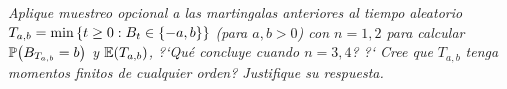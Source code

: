 \emph{
    Aplique muestreo opcional a las martingalas anteriores al tiempo 
    aleatorio $T_{a,b}=\min\left\{ t\geq 0:B_t\in\left\{ -a,b\right\} \right\} $ (para $a,b>0$) 
    con $n=1,2$ para calcular $\mathbb{P}\! \left( B_{T_{a,b}}=b \right)$ y $\mathbb{E}\! \left( T_{a,b} \right)$,
    ?`Qu\'e concluye cuando $n=3,4$? ?` Cree que $T_{a,b}$ tenga momentos 
    finitos de cualquier orden? Justifique su respuesta.\pn
}

\afterstatement\pn